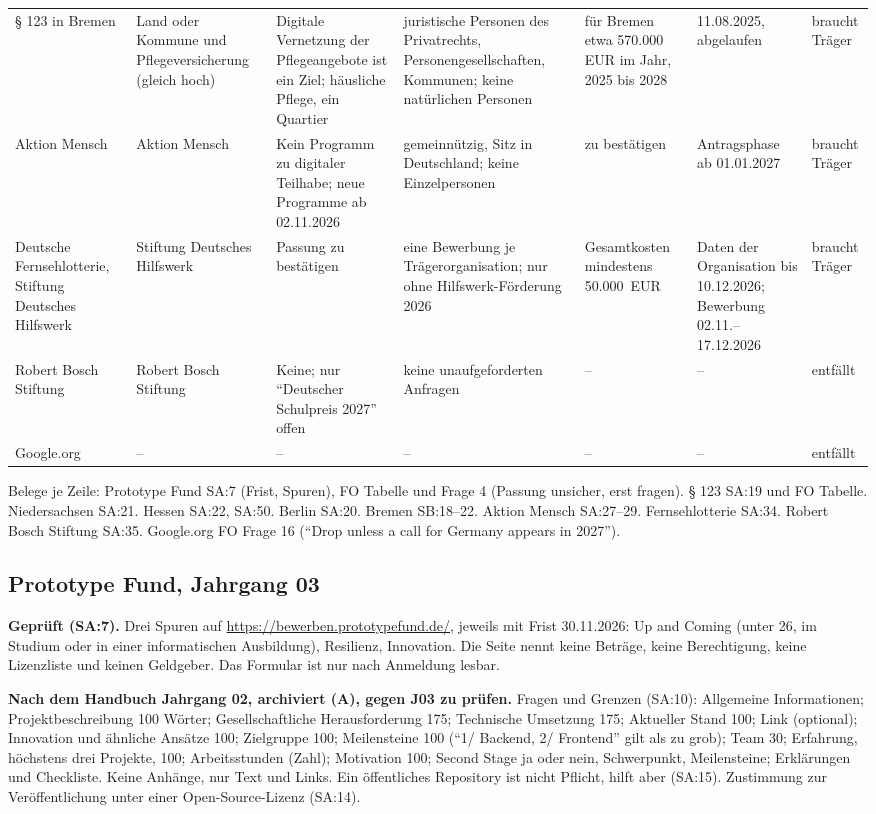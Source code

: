 \documentclass[10pt,parskip=half-]{scrartcl}
\newcommand{\nein}{--}
\begin{document}
{\begin{longtable}{@{}P{18mm}P{19mm}P{28mm}P{25mm}P{23mm}P{17mm}P{14mm}@{}}
§ 123 in Bremen & Land oder Kommune und Pflegeversicherung (gleich hoch) & Digitale Vernetzung
  der Pflegeangebote ist ein Ziel; häusliche Pflege, ein Quartier & juristische Personen des
  Privatrechts, Personengesellschaften, Kommunen; keine natürlichen Personen & für Bremen etwa
  570.000 EUR im Jahr, 2025 bis 2028 & 11.08.2025, abgelaufen & braucht Träger \\
Aktion Mensch & Aktion Mensch & Kein Programm zu digitaler Teilhabe; neue Programme ab
  02.11.2026 & gemeinnützig, Sitz in Deutschland; keine Einzelpersonen & zu bestätigen &
  Antragsphase ab 01.01.2027 & braucht Träger \\
Deutsche Fernsehlotterie, Stiftung Deutsches Hilfswerk & Stiftung Deutsches Hilfswerk &
  Passung zu bestätigen & eine Bewerbung je Trägerorganisation; nur ohne Hilfswerk-Förderung
  2026 & Gesamtkosten mindestens 50.000~EUR & Daten der Organisation bis 10.12.2026; Bewerbung
  02.11.--17.12.2026 & braucht Träger \\
Robert Bosch Stiftung & Robert Bosch Stiftung & Keine; nur \enquote{Deutscher Schulpreis
  2027} offen & keine unaufgeforderten Anfragen & \nein & \nein & entfällt \\
Google.org & \nein & \nein & \nein & \nein & \nein & entfällt \\
\bottomrule
\end{longtable}
}

Belege je Zeile: Prototype Fund SA:7 (Frist, Spuren), FO Tabelle und Frage 4 (Passung
unsicher, erst fragen). § 123 SA:19 und FO Tabelle. Niedersachsen SA:21. Hessen SA:22, SA:50.
Berlin SA:20. Bremen SB:18--22. Aktion Mensch SA:27--29. Fernsehlotterie SA:34. Robert Bosch Stiftung SA:35.
Google.org FO Frage 16 (\enquote{Drop unless a call for Germany appears in 2027}).

\subsection{Prototype Fund, Jahrgang 03}
\textbf{Geprüft (SA:7).} Drei Spuren auf \url{https://bewerben.prototypefund.de/}, jeweils mit
Frist 30.11.2026: Up and Coming (unter 26, im Studium oder in einer informatischen Ausbildung), Resilienz, Innovation.
Die Seite nennt keine Beträge, keine Berechtigung, keine Lizenzliste und keinen Geldgeber. Das
Formular ist nur nach Anmeldung lesbar.

\textbf{Nach dem Handbuch Jahrgang 02, archiviert (A), gegen J03 zu prüfen.} Fragen und
Grenzen (SA:10): Allgemeine Informationen; Projektbeschreibung 100 Wörter; Gesellschaftliche
Herausforderung 175; Technische Umsetzung 175; Aktueller Stand 100; Link (optional); Innovation
und ähnliche Ansätze 100; Zielgruppe 100; Meilensteine 100 (\enquote{1/ Backend, 2/ Frontend}
gilt als zu grob); Team 30; Erfahrung, höchstens drei Projekte, 100; Arbeitsstunden (Zahl);
Motivation 100; Second Stage ja oder nein, Schwerpunkt, Meilensteine; Erklärungen und
Checkliste. Keine Anhänge, nur Text und Links. Ein öffentliches Repository ist nicht Pflicht,
hilft aber (SA:15). Zustimmung zur Veröffentlichung unter einer Open-Source-Lizenz (SA:14).
\end{document}
